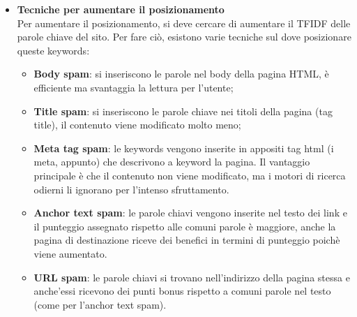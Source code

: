 \documentclass[10pt,                    %
               a4paper,                 %
               twoside,                 %
               openright,               %
               english,                 
               italian,                 
]{article}
\begin{document}
\begin{itemize}
\item \textbf{Tecniche per aumentare il posizionamento} \\
Per aumentare il posizionamento, si deve cercare di aumentare il TFIDF delle 
parole chiave del sito. Per fare ciò, esistono varie tecniche sul dove 
posizionare queste keywords:
\begin{itemize}
\item \textbf{Body spam}: si inseriscono le parole nel body della pagina
HTML, è efficiente ma svantaggia la lettura per l'utente;
\item \textbf{Title spam}: si inseriscono le parole chiave nei titoli della 
pagina (tag title), il contenuto viene modificato molto meno;
\item \textbf{Meta tag spam}: le keywords vengono inserite in appositi tag 
html (i meta, appunto) che descrivono a keyword la pagina. Il vantaggio 
principale è che il contenuto non viene modificato, ma i motori di ricerca 
odierni li ignorano per l'intenso sfruttamento.
\item \textbf{Anchor text spam}: le parole chiavi vengono inserite nel testo 
dei link e il punteggio assegnato rispetto alle comuni parole è maggiore, 
anche la pagina di destinazione riceve dei benefici in termini di punteggio 
poichè viene aumentato.
\item \textbf{URL spam}: le parole chiavi si trovano nell'indirizzo della 
pagina stessa e anche'essi ricevono dei punti bonus rispetto a comuni parole 
nel testo (come per l'anchor text spam).  
\end{itemize}


\end{itemize}
\end{document}
